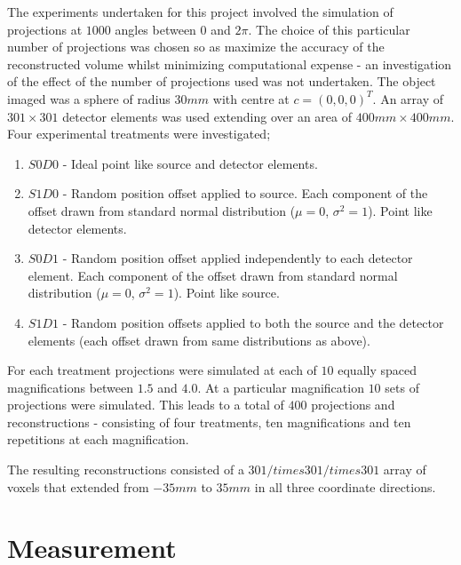 \documentclass[
  twoside,
  11pt, a4paper,
  footinclude=true,
  headinclude=true,
  cleardoublepage=empty
]{scrbook}
\begin{document}
The experiments undertaken for this project involved the simulation of projections at $1000$ angles between $0$ and $2\pi$. The choice of this particular number of projections was chosen so as maximize the accuracy of the reconstructed volume whilst minimizing computational expense - an investigation of the effect of the number of projections used was not undertaken. The object imaged was a sphere of radius $30mm$ with centre at $c = (0,0,0)^T$. An array of $301\times301$ detector elements was used extending over an area of $400mm\times400mm$. Four experimental treatments were investigated;

\begin{enumerate}
\item $S0D0$ - Ideal point like source and detector elements.
\item $S1D0$ - Random position offset applied to source. Each component of the offset drawn from standard normal distribution ($\mu = 0$, $\sigma^2 = 1$). Point like detector elements.
\item $S0D1$ - Random position offset applied independently to each detector element. Each component of the offset drawn from standard normal distribution ($\mu = 0$, $\sigma^2 = 1$). Point like source.
\item $S1D1$ - Random position offsets applied to both the source and the detector elements (each offset drawn from same distributions as above).
\end{enumerate}

For each treatment projections were simulated at each of $10$ equally spaced magnifications between $1.5$ and $4.0$. At a particular magnification $10$ sets of projections were simulated. This leads to a total of $400$ projections and reconstructions - consisting of four treatments, ten magnifications and ten repetitions at each magnification.

The resulting reconstructions consisted of a $301/times301/times301$ array of voxels that extended from $-35mm$ to $35mm$ in all three coordinate directions.

\section{Measurement}
\end{document}
